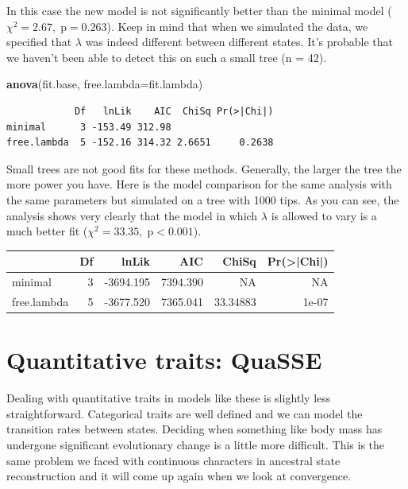 \documentclass[
]{book}
\newenvironment{Shaded}{\begin{snugshade}}{\end{snugshade}}
\newcommand{\DataTypeTok}[1]{\textcolor[rgb]{0.13,0.29,0.53}{#1}}
\newcommand{\KeywordTok}[1]{\textcolor[rgb]{0.13,0.29,0.53}{\textbf{#1}}}
\newcommand{\NormalTok}[1]{#1}
\begin{document}
In this case the new model is not significantly better than the minimal model (\(\chi^{2} = 2.67, \; \text{p} = 0.263\)). Keep in mind that when we simulated the data, we specified that \(\lambda\) was indeed different between different states. It's probable that we haven't been able to detect this on such a small tree (n = 42).

\begin{Shaded}
\begin{Highlighting}[]
\KeywordTok{anova}\NormalTok{(fit.base, }\DataTypeTok{free.lambda=}\NormalTok{fit.lambda)}
\end{Highlighting}
\end{Shaded}

\begin{verbatim}
            Df   lnLik    AIC  ChiSq Pr(>|Chi|)
minimal      3 -153.49 312.98                  
free.lambda  5 -152.16 314.32 2.6651     0.2638
\end{verbatim}

Small trees are not good fits for these methods. Generally, the larger the tree the more power you have. Here is the model comparison for the same analysis with the same parameters but simulated on a tree with 1000 tips. As you can see, the analysis shows very clearly that the model in which \(\lambda\) is allowed to vary is a much better fit (\(\chi^{2} = 33.35, \; \text{p} < 0.001\)).

\begin{tabular}{l|r|r|r|r|r}
\hline
  & Df & lnLik & AIC & ChiSq & Pr(>|Chi|)\\
\hline
minimal & 3 & -3694.195 & 7394.390 & NA & NA\\
\hline
free.lambda & 5 & -3677.520 & 7365.041 & 33.34883 & 1e-07\\
\hline
\end{tabular}

\hypertarget{quantitative-traits-quasse}{%
\section{Quantitative traits: QuaSSE}\label{quantitative-traits-quasse}}

Dealing with quantitative traits in models like these is slightly less straightforward. Categorical traits are well defined and we can model the transition rates between states. Deciding when something like body mass has undergone significant evolutionary change is a little more difficult. This is the same problem we faced with continuous characters in ancestral state reconstruction and it will come up again when we look at convergence.
\end{document}
